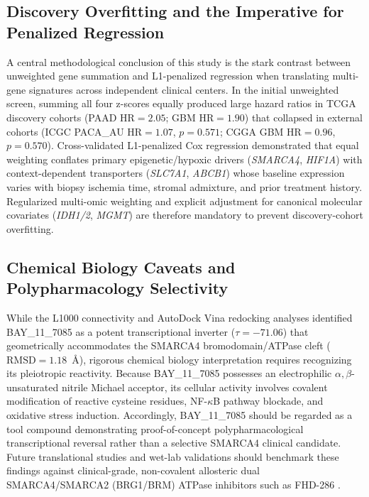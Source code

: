\documentclass[11pt,a4paper]{article}
\begin{document}
\subsection{Discovery Overfitting and the Imperative for Penalized Regression}
A central methodological conclusion of this study is the stark contrast between unweighted gene summation and L1-penalized regression when translating multi-gene signatures across independent clinical centers. In the initial unweighted screen, summing all four z-scores equally produced large hazard ratios in TCGA discovery cohorts (PAAD $\text{HR} = 2.05$; GBM $\text{HR} = 1.90$) that collapsed in external cohorts (ICGC PACA\_AU $\text{HR} = 1.07$, $p = 0.571$; CGGA GBM $\text{HR} = 0.96$, $p = 0.570$). Cross-validated L1-penalized Cox regression demonstrated that equal weighting conflates primary epigenetic/hypoxic drivers (\textit{SMARCA4}, \textit{HIF1A}) with context-dependent transporters (\textit{SLC7A1}, \textit{ABCB1}) whose baseline expression varies with biopsy ischemia time, stromal admixture, and prior treatment history. Regularized multi-omic weighting and explicit adjustment for canonical molecular covariates (\textit{IDH1/2}, \textit{MGMT}) are therefore mandatory to prevent discovery-cohort overfitting.

\subsection{Chemical Biology Caveats and Polypharmacology Selectivity}
While the L1000 connectivity and AutoDock Vina redocking analyses identified BAY\_11\_7085 as a potent transcriptional inverter ($\tau = -71.06$) that geometrically accommodates the SMARCA4 bromodomain/ATPase cleft ($\text{RMSD} = 1.18$~\AA), rigorous chemical biology interpretation requires recognizing its pleiotropic reactivity. Because BAY\_11\_7085 possesses an electrophilic $\alpha,\beta$-unsaturated nitrile Michael acceptor, its cellular activity involves covalent modification of reactive cysteine residues, NF-$\kappa$B pathway blockade, and oxidative stress induction. Accordingly, BAY\_11\_7085 should be regarded as a tool compound demonstrating proof-of-concept polypharmacological transcriptional reversal rather than a selective SMARCA4 clinical candidate. Future translational studies and wet-lab validations should benchmark these findings against clinical-grade, non-covalent allosteric dual SMARCA4/SMARCA2 (BRG1/BRM) ATPase inhibitors such as FHD-286 \cite{fhd286_2023}.
\end{document}
